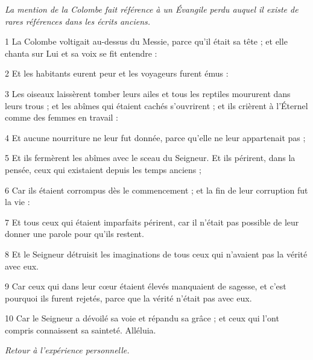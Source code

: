 
\par \textit{La mention de la Colombe fait référence à un Évangile perdu auquel il existe de rares références dans les écrits anciens.}

\par 1 La Colombe voltigait au-dessus du Messie, parce qu'il était sa tête ; et elle chanta sur Lui et sa voix se fit entendre :
\par 2 Et les habitants eurent peur et les voyageurs furent émus :
\par 3 Les oiseaux laissèrent tomber leurs ailes et tous les reptiles moururent dans leurs trous ; et les abîmes qui étaient cachés s'ouvrirent ; et ils crièrent à l'Éternel comme des femmes en travail :
\par 4 Et aucune nourriture ne leur fut donnée, parce qu'elle ne leur appartenait pas ;
\par 5 Et ils fermèrent les abîmes avec le sceau du Seigneur. Et ils périrent, dans la pensée, ceux qui existaient depuis les temps anciens ;
\par 6 Car ils étaient corrompus dès le commencement ; et la fin de leur corruption fut la vie :
\par 7 Et tous ceux qui étaient imparfaits périrent, car il n'était pas possible de leur donner une parole pour qu'ils restent.
\par 8 Et le Seigneur détruisit les imaginations de tous ceux qui n'avaient pas la vérité avec eux.
\par 9 Car ceux qui dans leur cœur étaient élevés manquaient de sagesse, et c'est pourquoi ils furent rejetés, parce que la vérité n'était pas avec eux.
\par 10 Car le Seigneur a dévoilé sa voie et répandu sa grâce ; et ceux qui l'ont compris connaissent sa sainteté. Alléluia.


\par \textit{Retour à l'expérience personnelle.}

